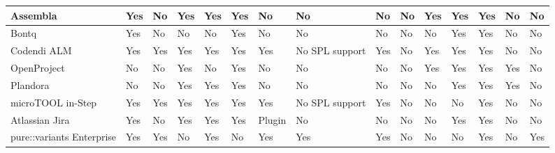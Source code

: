 \begin{landscape}
\begin{table}[!ht]
\begin{center}
\begin{tabular}{|l|l|l|l|l|l|l|l|l|l|l|l|l|l|l|}
    Assembla                  & Yes             & No           & Yes            & Yes                         & Yes            & No      & No             & No           & No                      & Yes                         & Yes       & Yes                & No          & No           \\ \hline
    Bontq                     & Yes             & No           & No             & No                          & Yes            & No      & No             & No           & No                      & No                          & Yes       & Yes                & No          & No           \\ \hline
    Codendi ALM               & Yes             & Yes          & Yes            & Yes                         & Yes            & Yes     & No SPL support & Yes          & No                      & Yes                         & Yes       & Yes                & No          & No           \\ \hline
    OpenProject               & No              & No           & Yes            & No                          & Yes            & No      & No             & No           & No                      & Yes                         & Yes       & Yes                & Yes         & No           \\ \hline
    Plandora                  & No              & No           & Yes            & Yes                         & Yes            & No      & No             & No           & No                      & No                          & Yes       & Yes                & Yes         & No           \\ \hline
    microTOOL in-Step         & Yes             & Yes          & Yes            & Yes                         & Yes            & Yes     & No SPL support & Yes          & No                      & No                          & No        & Yes                & No          & No           \\ \hline
    Atlassian Jira            & Yes             & No           & Yes            & Yes                         & Yes            & Plugin  & No             & No           & No                      & No                          & Yes       & Yes                & No          & No           \\ \hline
    pure::variants Enterprise & Yes             & Yes          & No             & Yes                         & No             & Yes     & Yes            & Yes          & No                      & No                          & No        & Yes                & No          & Yes          \\ \hline

\end{tabular}
\end{center}
\end{table}
\end{landscape}
